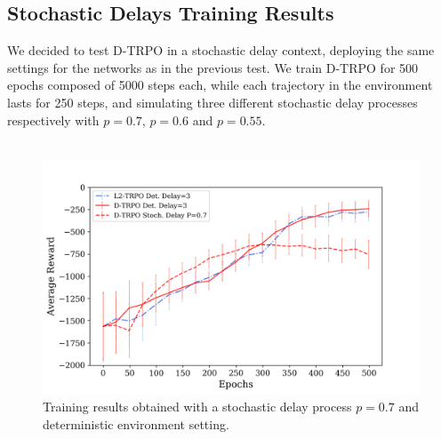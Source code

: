         \subsection{Stochastic Delays Training Results}
        \label{sub:res_stoch_delays}
            We decided to test D-TRPO in a stochastic delay context, deploying the same settings for the networks as in the previous test. We train D-TRPO for 500 epochs composed of 5000 steps each, while each trajectory in the environment lasts for 250 steps, and simulating three different stochastic delay processes respectively with $p=0.7$, $p=0.6$ and $p=0.55$.
            \\\\
            
            \begin{figure}[!b]
                \includegraphics[width=15cm, keepaspectratio]{images/results/delayp07_comparisons_1.png}
                \caption{Training results obtained with a stochastic delay process $p=0.7$ and deterministic environment setting.}
                \label{fig:results_delayp07_1}
            \end{figure}
            
